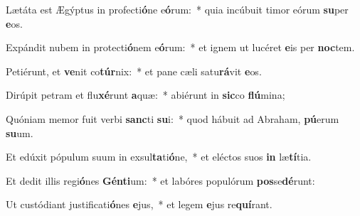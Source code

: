 \item Lætáta est Ægýptus in profecti\textbf{ó}ne e\textbf{ó}rum:~* quia incúbuit timor eórum \textbf{su}per \textbf{e}os.
\item Expándit nubem in protecti\textbf{ó}nem e\textbf{ó}rum:~* et ignem ut lucéret \textbf{e}is per \textbf{noc}tem.
\item Petiérunt, et \textbf{ve}nit co\textbf{túr}nix:~* et pane cæli satu\textbf{rá}vit \textbf{e}os.
\item Dirúpit petram et flu\textbf{xé}runt \textbf{a}quæ:~* abiérunt in \textbf{sic}co \textbf{flú}mina;
\item Quóniam memor fuit verbi \textbf{sanc}ti \textbf{su}i:~* quod hábuit ad Abraham, \textbf{pú}erum \textbf{su}um.
\item Et edúxit pópulum suum in exsul\textbf{ta}ti\textbf{ó}ne,~* et eléctos suos \textbf{in} læ\textbf{tí}tia.
\item Et dedit illis regi\textbf{ó}nes \textbf{Gén}\textbf{ti}um:~* et labóres populórum \textbf{pos}se\textbf{dé}runt:
\item Ut custódiant justificati\textbf{ó}nes \textbf{e}jus,~* et legem \textbf{e}jus re\textbf{quí}rant.
